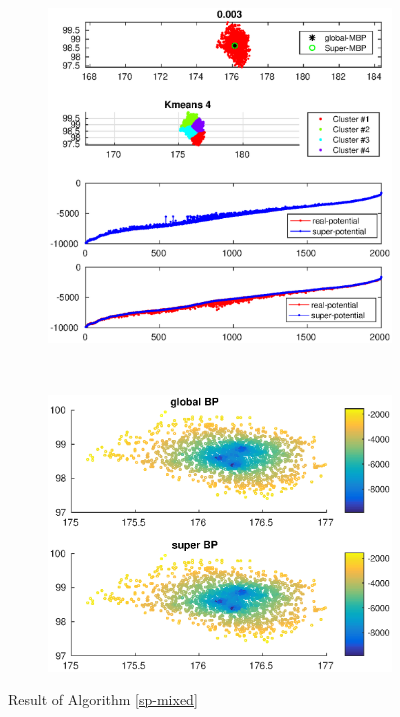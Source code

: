\documentclass[10pt]{article}
\begin{document}
\begin{figure}[t!]
\centering
\begin{subfigure}[t]{0.5\textwidth}
\centering
\includegraphics[scale=0.45]{sp_p_mixed_kmeans}
\end{subfigure}%
~ 
\begin{subfigure}[t]{0.5\textwidth}
\centering
\includegraphics[scale=0.45]{sp_p_mixed_kmeans_bp}
\end{subfigure}
\caption{Result of Algorithm \ref{sp-mixed}}
\end{figure}
\end{document}
